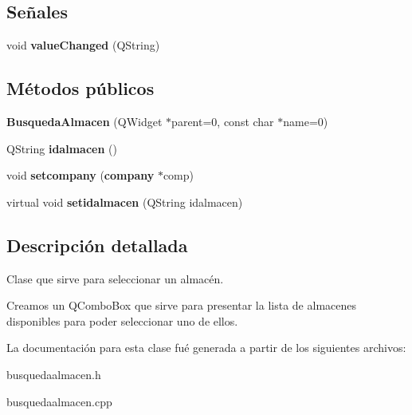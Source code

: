 \subsection*{Se\~{n}ales}
\begin{CompactItemize}
\item 
void {\bf value\-Changed} (QString)\label{classBusquedaAlmacen_l0}

\end{CompactItemize}
\subsection*{M\'{e}todos p\'{u}blicos}
\begin{CompactItemize}
\item 
{\bf Busqueda\-Almacen} (QWidget $\ast$parent=0, const char $\ast$name=0)\label{classBusquedaAlmacen_a0}

\item 
QString {\bf idalmacen} ()\label{classBusquedaAlmacen_a1}

\item 
void {\bf setcompany} ({\bf company} $\ast$comp)\label{classBusquedaAlmacen_a2}

\item 
virtual void {\bf setidalmacen} (QString idalmacen)\label{classBusquedaAlmacen_a3}

\end{CompactItemize}


\subsection{Descripci\'{o}n detallada}
Clase que sirve para seleccionar un almac\'{e}n. 

Creamos un QCombo\-Box que sirve para presentar la lista de almacenes disponibles para poder seleccionar uno de ellos. 



La documentaci\'{o}n para esta clase fu\'{e} generada a partir de los siguientes archivos:\begin{CompactItemize}
\item 
busquedaalmacen.h\item 
busquedaalmacen.cpp\end{CompactItemize}
